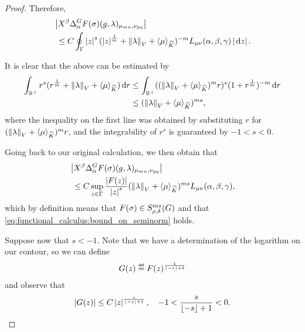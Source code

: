 \begin{proof}
    Therefore,
    \begin{align*}
        &\abs {%
            \LeftDifferentialOperator \beta \DifferenceOperator \alpha
            F(\sigma)(g, \lambda)_{\mu_{m n}, \nu_{p q}}
        }\\
        &\ \leq C \oint_{\Gamma}
        \abs z^s
        (\abs z^{\frac 1 m} + \norm [\VectorSpace] \lambda + \JapaneseBracket \CompactGroup \mu)^{-m} L_{\mu \nu}(\alpha, \beta, \gamma) \abs {\dd z}.
    \end{align*}

    It is clear that the above can be estimated by
    \begin{align*}
        \int_{\mathbb{R}^+} r^s (r^{\frac 1 m} + {\left\| \lambda \right\|}_{V} + {\langle \mu \rangle}_{{\widehat{K}}}) \,\mathrm{d} r
        &\leq \int_{\mathbb{R}^+} (({\left\| \lambda \right\|}_{V} + {\langle \mu \rangle}_{{\widehat{K}}})^m r)^s (1 + r^{\frac 1 m})^{-m} \,\mathrm{d} r\\
        &\leq ({\left\| \lambda \right\|}_{V} + {\langle \mu \rangle}_{{\widehat{K}}})^{m s},
    \end{align*}
    where the inequality on the first line was obtained by substituting $r$ for $({\left\| \lambda \right\|}_{V} + {\langle \mu \rangle}_{{\widehat{K}}})^m r$,
    and the integrability of $r^s$ is guaranteed by $-1 < s < 0$.

    Going back to our original calculation,
    we then obtain that
    \begin{align*}
        &\abs {%
            \LeftDifferentialOperator \beta \DifferenceOperator \alpha
            F(\sigma)(g, \lambda)_{\mu_{m n}, \nu_{p q}}
        }\\
        &\ \leq C
        \sup_{z \in \Gamma} \frac {\abs {F(z)}} {\abs z^s}
        (\norm \lambda + \JapaneseBracket \CompactGroup \mu)^{m s}
        L_{\mu \nu}(\alpha, \beta, \gamma),
    \end{align*}
    which by definition means that $F(\sigma) \in S^{m s}_{\rho, \delta}(G)$ and that \ref{eq:functional_calculus:bound_on_seminorm} holds.

    Suppose now that $s < -1$.
    Note that we have a determination of the logarithm on our contour,
    so we can define
    \begin{align*}
        G(z) \defeq F(z)^{\frac 1 {\Floor{-s} + 1}}
    \end{align*}
    and observe that
    \begin{align*}
        \left|{G(z)}\right| \leq C \left|{z}\right|^{\frac s {\lfloor-s\rfloor + 1}},
        \quad
        -1 < \frac s {\lfloor-s\rfloor + 1} < 0.
    \end{align*}


\end{proof}
